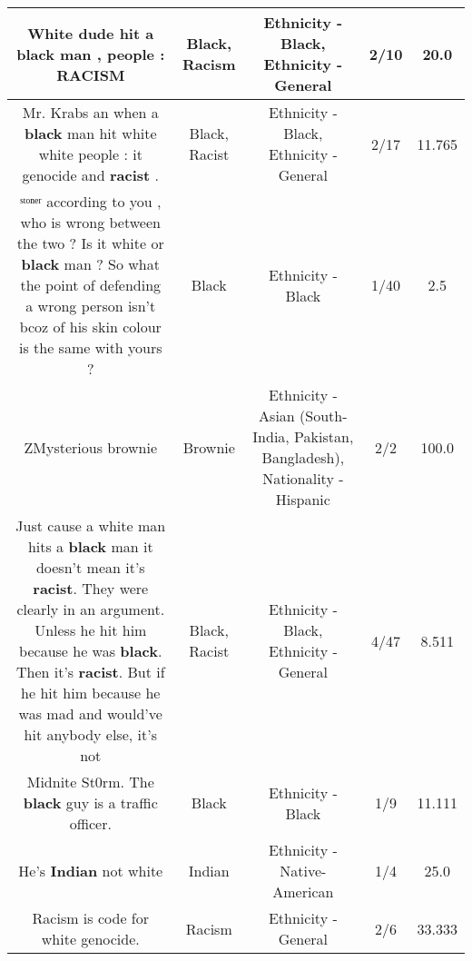 \documentclass[11pt]{article}
\newlength\mylength
\begin{document}
\begin{center}
\begin{longtable}{|C{.65\mylength}|C{.30\mylength}|C{.12\mylength}|C{.12\mylength}|C{.12\mylength}|}
  \small White dude hit a \textbf{black} man , people  : RACISM\normalsize   & Black, Racism & Ethnicity - Black, Ethnicity - General & 2/10 & 20.0 \\  \hline
  \small Mr. Krabs an when a \textbf{black} man hit white white people : it genocide and \textbf{racist} .\normalsize   & Black, Racist & Ethnicity - Black, Ethnicity - General & 2/17 & 11.765 \\  \hline
  \small ˢᵗᵒⁿᵉʳ  according to you , who is wrong between the two ? Is it white or \textbf{black} man ? So what the point of defending a wrong person isn't bcoz of his skin colour is the same with yours ?\normalsize   & Black & Ethnicity - Black & 1/40 & 2.5 \\  \hline
  \small ZMysterious brownie\normalsize   & Brownie & Ethnicity - Asian (South- India, Pakistan, Bangladesh), Nationality - Hispanic & 2/2 & 100.0 \\  \hline
  \small Just cause a white man hits a \textbf{black} man it doesn't mean it's \textbf{racist}. They were clearly in an argument. Unless he hit him because he was \textbf{black}. Then it's \textbf{racist}. But if he hit him because he was mad and would've hit anybody else, it's not\normalsize   & Black, Racist & Ethnicity - Black, Ethnicity - General & 4/47 & 8.511 \\  \hline
  \small Midnite St0rm. The \textbf{black} guy is a traffic officer.\normalsize   & Black & Ethnicity - Black & 1/9 & 11.111 \\  \hline
  \small He's \textbf{Indian} not white\normalsize   & Indian & Ethnicity - Native-American & 1/4 & 25.0 \\  \hline
  \small Racism is code for white genocide.\normalsize   & Racism & Ethnicity - General & 2/6 & 33.333 \\  \hline

\end{longtable}
\end{center}
\end{document}
